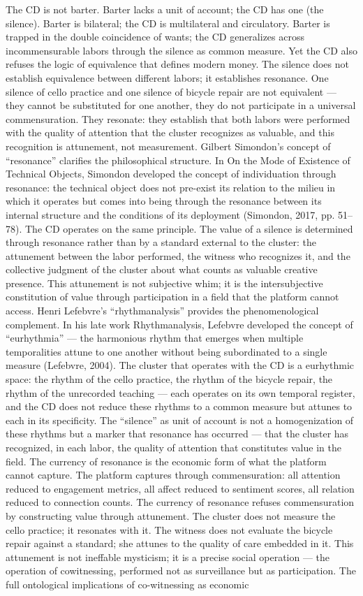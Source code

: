 The CD is not barter. Barter lacks a unit of account; the CD has one (the silence). Barter is bilateral; the CD is multilateral and circulatory. Barter is trapped in the double coincidence of wants; the CD generalizes across incommensurable labors through the silence as common measure. Yet the CD also refuses the logic of equivalence that defines modern money. The silence does not establish equivalence between different labors; it establishes resonance. One silence of cello practice and one silence of bicycle repair are not equivalent — they cannot be substituted for one another, they do not participate in a universal commensuration. They resonate: they establish that both labors were performed with the quality of attention that the cluster recognizes as valuable, and this recognition is attunement, not measurement. Gilbert Simondon’s concept of “resonance” clarifies the philosophical structure. In On the Mode of Existence of Technical Objects, Simondon developed the concept of individuation through resonance: the technical object does not pre-exist its relation to the milieu in which it operates but comes into being through the resonance between its internal structure and the conditions of its deployment (Simondon, 2017, pp. 51–78). The CD operates on the same principle. The value of a silence is determined through resonance rather than by a standard external to the cluster: the attunement between the labor performed, the witness who recognizes it, and the collective judgment of the cluster about what counts as valuable creative presence. This attunement is not subjective whim; it is the intersubjective constitution of value through participation in a field that the platform cannot access. Henri Lefebvre’s “rhythmanalysis” provides the phenomenological complement. In his late work Rhythmanalysis, Lefebvre developed the concept of “eurhythmia” — the harmonious rhythm that emerges when multiple temporalities attune to one another without being subordinated to a single measure (Lefebvre, 2004). The cluster that operates with the CD is a eurhythmic space: the rhythm of the cello practice, the rhythm of the bicycle repair, the rhythm of the unrecorded teaching — each operates on its own temporal register, and the CD does not reduce these rhythms to a common measure but attunes to each in its specificity. The “silence” as unit of account is not a homogenization of these rhythms but a marker that resonance has occurred — that the cluster has recognized, in each labor, the quality of attention that constitutes value in the field. The currency of resonance is the economic form of what the platform cannot capture. The platform captures through commensuration: all attention reduced to engagement metrics, all affect reduced to sentiment scores, all relation reduced to connection counts. The currency of resonance refuses commensuration by constructing value through attunement. The cluster does not measure the cello practice; it resonates with it. The witness does not evaluate the bicycle repair against a standard; she attunes to the quality of care embedded in it. This attunement is not ineffable mysticism; it is a precise social operation — the operation of cowitnessing, performed not as surveillance but as participation. The full ontological implications of co-witnessing as economic 